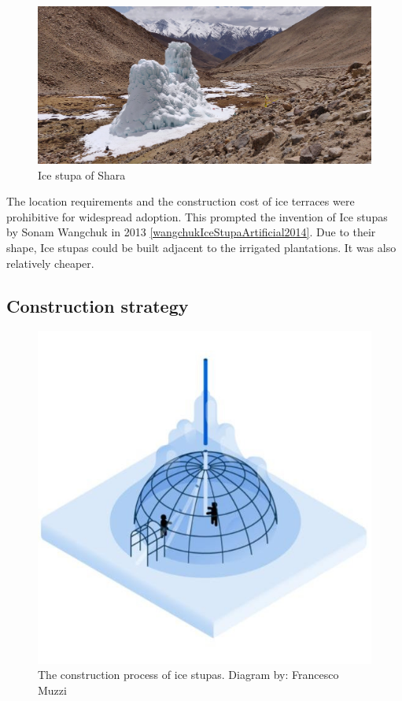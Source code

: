 \begin{figure}[t]
\centering
\includegraphics[width=12cm]{figs/IS_example.jpg}

\caption{Ice stupa of Shara}

\label{fig:ISexample}
\end{figure}

The location requirements and the construction cost of ice terraces were prohibitive for widespread adoption.
This prompted the invention of Ice stupas by Sonam Wangchuk in 2013 \ref{wangchukIceStupaArtificial2014}. Due to
their shape, Ice stupas could be built adjacent to the irrigated plantations. It was also relatively cheaper. 


\subsection{Construction strategy}

\begin{figure}[t]
\centering
\includegraphics[width=12cm]{figs/IS_science.jpg}

\caption{The construction process of ice stupas. Diagram by: Francesco Muzzi }

\label{fig:ISscience}
\end{figure}

